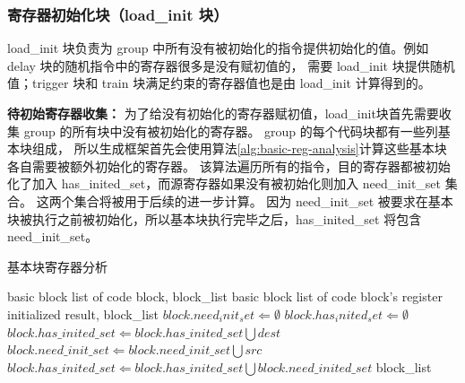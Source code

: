 \subsubsection{寄存器初始化块（load\_init 块）}
load\_init 块负责为 group 中所有没有被初始化的指令提供初始化的值。例如 delay 块的随机指令中的寄存器很多是没有赋初值的，
需要 load\_init 块提供随机值；trigger 块和 train 块满足约束的寄存器值也是由 load\_init 计算得到的。\par

\textbf{待初始寄存器收集：}
为了给没有初始化的寄存器赋初值，load\_init块首先需要收集 group 的所有块中没有被初始化的寄存器。
group 的每个代码块都有一些列基本块组成，
所以生成框架首先会使用算法\ref{alg:basic-reg-analysis}计算这些基本块各自需要被额外初始化的寄存器。
该算法遍历所有的指令，目的寄存器都被初始化了加入 has\_inited\_set，而源寄存器如果没有被初始化则加入 need\_init\_set 集合。
这两个集合将被用于后续的进一步计算。
因为 need\_init\_set 被要求在基本块被执行之前被初始化，所以基本块执行完毕之后，has\_inited\_set 将包含  need\_init\_set。 \par

\begin{algorithm}[!h]
    \caption{基本块寄存器分析}
    \label{alg:basic-reg-analysis}
    \renewcommand{\algorithmicrequire}{\textbf{Input:}}
    \renewcommand{\algorithmicensure}{\textbf{Output:}}
    
    \begin{algorithmic}[1]
        \REQUIRE basic block list of code block, block\_list  %
        \ENSURE  basic block list of code block's register initialized result, block\_list  %
            \STATE $block.need_init_set \Leftarrow \emptyset$
            \STATE $block.has_inited_set \Leftarrow \emptyset$
                    \STATE $block.has\_inited\_set \Leftarrow block.has\_inited\_set \bigcup dest$
                \ENDFOR
                        \STATE $block.need\_init\_set \Leftarrow block.need\_init\_set \bigcup src$
                    \ENDIF
                \ENDFOR
            \ENDFOR
            \STATE $block.has\_inited\_set \Leftarrow block.has\_inited\_set \bigcup block.need\_inited\_set$
        \ENDFOR
        \RETURN block\_list
    \end{algorithmic}
\end{algorithm}

